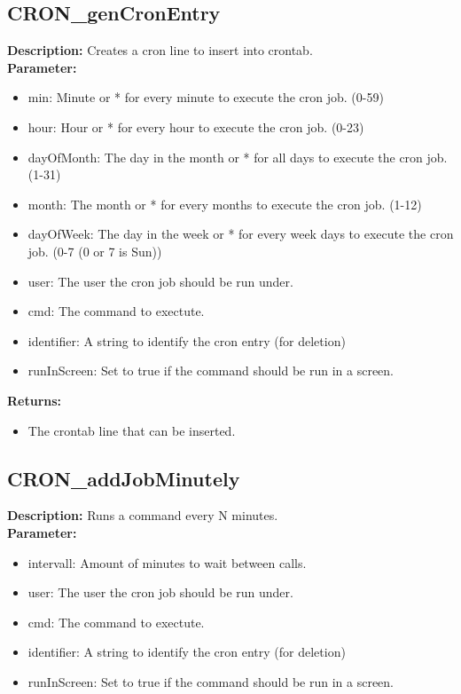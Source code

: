 \subsection{CRON\_genCronEntry}
\textbf{Description:} Creates a cron line to insert into crontab.\\
\textbf{Parameter:}
\begin{itemize}
\item min: Minute or * for every minute to execute the cron job. (0-59)
\item hour: Hour or * for every hour to execute the cron job. (0-23)
\item dayOfMonth: The day in the month or * for all days to execute the cron job. (1-31)
\item month: The month or * for every months to execute the cron job. (1-12)
\item dayOfWeek: The day in the week or * for every week days to execute the cron job. (0-7 (0 or 7 is Sun))
\item user: The user the cron job should be run under.
\item cmd: The command to exectute.
\item identifier: A string to identify the cron entry (for deletion)
\item runInScreen: Set to true if the command should be run in a screen.
\end{itemize}
\textbf{Returns:}
\begin{itemize}
\item The crontab line that can be inserted.
\end{itemize}

\subsection{CRON\_addJobMinutely}
\textbf{Description:} Runs a command every N minutes.\\
\textbf{Parameter:}
\begin{itemize}
\item intervall: Amount of minutes to wait between calls.
\item user: The user the cron job should be run under.
\item cmd: The command to exectute.
\item identifier: A string to identify the cron entry (for deletion)
\item runInScreen: Set to true if the command should be run in a screen.
\end{itemize}

